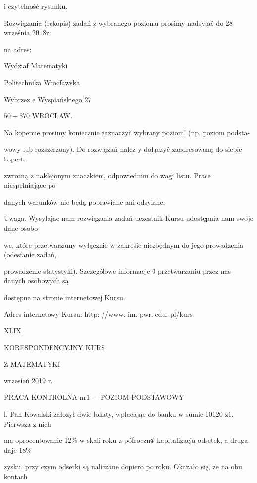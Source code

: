 \documentclass[a4paper,12pt]{article}
\begin{document}
$\mathrm{i}$ czytelnośč rysunku.

Rozwiązania (rękopis) zadań $\mathrm{z}$ wybranego poziomu prosimy nadsyłač do 28 września $2018\mathrm{r}.$

na adres:

Wydziaf Matematyki

Politechnika Wrocfawska

Wybrzez $\mathrm{e}$ Wyspiańskiego 27

$50-370$ WROCLAW.

Na kopercie prosimy $\underline{\mathrm{k}\mathrm{o}\mathrm{n}\mathrm{i}\mathrm{e}\mathrm{c}\mathrm{z}\mathrm{n}\mathrm{i}\mathrm{e}}$ zaznaczyč wybrany poziom! (np. poziom podsta-

wowy lub rozszerzony). Do rozwiązań nalez $\mathrm{y}$ dołączyč zaadresowaną do siebie koperte

zwrotną $\mathrm{z}$ naklejonym znaczkiem, odpowiednim do wagi listu. Prace niespelniające po-

danych warunków nie będą poprawiane ani odsylane.

Uwaga. Wysylajac nam rozwiązania zadań uczestnik Kursu udostępnia nam swoje dane osobo-

we, które przetwarzamy wyłącznie $\mathrm{w}$ zakresie niezbędnym do jego prowadzenia (odesfanie zadań,

prowadzenie statystyki). Szczególowe informacje $0$ przetwarzaniu przez nas danych osobowych są

dostępne na stronie internetowej Kursu.

Adres internetowy Kursu: http: //www. im. pwr. edu. pl/kurs







XLIX

KORESPONDENCYJNY KURS

Z MATEMATYKI

wrzesień 2019 r.

PRACA KONTROLNA $\mathrm{n}\mathrm{r} 1 -$ POZIOM PODSTAWOWY

l. Pan Kowalski załozył dwie lokaty, wplacając do banku $\mathrm{w}$ sumie 10120 $\mathrm{z}1$. Pierwsza $\mathrm{z}$ nich

ma oprocentowanie 12\% $\mathrm{w}$ skali roku $\mathrm{z}$ pófroczn$\Phi$ kapitalizacją odsetek, a druga daje 18\%

zysku, przy czym odsetki są naliczane dopiero po roku. Okazało się, $\dot{\mathrm{z}}\mathrm{e}$ na obu kontach
\end{document}
